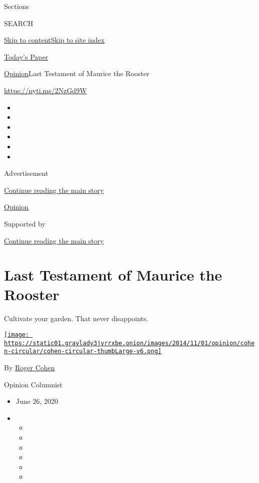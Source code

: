 Sections

SEARCH

\protect\hyperlink{site-content}{Skip to
content}\protect\hyperlink{site-index}{Skip to site index}

\href{https://myaccount.nytimes3xbfgragh.onion/auth/login?response_type=cookie\&client_id=vi}{}

\href{https://www.nytimes3xbfgragh.onion/section/todayspaper}{Today's
Paper}

\href{/section/opinion}{Opinion}\textbar{}Last Testament of Maurice the
Rooster

\url{https://nyti.ms/2NzGd9W}

\begin{itemize}
\item
\item
\item
\item
\item
\item
\end{itemize}

Advertisement

\protect\hyperlink{after-top}{Continue reading the main story}

\href{/section/opinion}{Opinion}

Supported by

\protect\hyperlink{after-sponsor}{Continue reading the main story}

\hypertarget{last-testament-of-maurice-the-rooster}{%
\section{Last Testament of Maurice the
Rooster}\label{last-testament-of-maurice-the-rooster}}

Cultivate your garden. That never disappoints.

\href{https://www.nytimes3xbfgragh.onion/by/roger-cohen}{\texttt{[image: https://static01.graylady3jvrrxbe.onion/images/2014/11/01/opinion/cohen-circular/cohen-circular-thumbLarge-v6.png]}}

By \href{https://www.nytimes3xbfgragh.onion/by/roger-cohen}{Roger Cohen}

Opinion Columnist

\begin{itemize}
\item
  June 26, 2020
\item
  \begin{itemize}
  \item
  \item
  \item
  \item
  \item
  \item
  \end{itemize}
\end{itemize}

